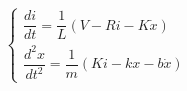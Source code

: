 \documentclass[preview]{standalone}
\begin{document}
\begin{align*}
\begin{cases}\dfrac{di}{dt} = \dfrac{1}{L}(V - Ri - K\dot{x}) \\\dfrac{d^2x}{dt^2} = \dfrac{1}{m}(Ki - kx - b\dot{x})\end{cases}
\end{align*}
\end{document}
